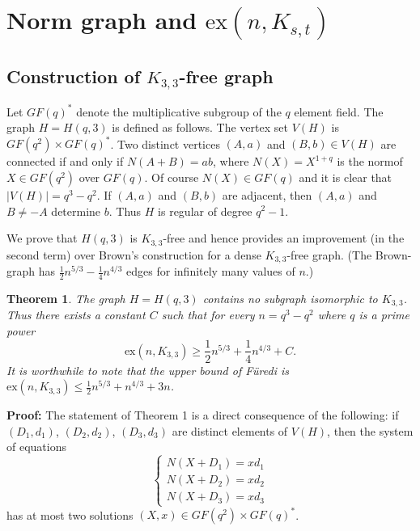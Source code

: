 \documentclass[12pt]{article}
\newtheorem{theorem}{Theorem}
\newcommand{\ex}{\mathrm{ex}}
\begin{document}
\section{Norm graph and $\ex(n,K_{s,t})$}
\subsection{Construction of $K_{3,3}$-free graph}
	Let $ GF(q)^* $ denote the multiplicative subgroup of the $ q $ element field. The graph $ H = H(q, 3) $ is defined as follows. The vertex set $ V(H) $ is $ GF(q^2) \times GF(q)^* $. Two distinct vertices $ (A, a) $ and $ (B, b) \in V(H) $ are connected if and only if $ N(A + B) = ab $, where $ N(X) = X^{1 + q} $ is the norm\footnotemark[1] of $ X \in GF(q^2) $ over $ GF(q) $. Of course $ N(X) \in GF(q) $ and it is clear that $ |V(H)| = q^3 - q^2 $. If $ (A, a) $ and $ (B, b) $ are adjacent, then $ (A, a) $ and $ B \neq -A $ determine $ b $. Thus $ H $ is regular of degree $ q^2 - 1 $.
	
	We prove that $ H(q, 3) $ is $ K_{3,3} $-free and hence provides an improvement (in the second term) over Brown's construction for a dense $ K_{3,3} $-free graph. (The Brown-graph has $ \frac{1}{2}n^{5/3} - \frac{1}{4}n^{4/3} $ edges for infinitely many values of $ n $.)
	
	\begin{theorem}\label{alonthm}
		The graph $ H = H(q, 3) $ contains no subgraph isomorphic to $ K_{3,3} $. Thus there exists a constant $ C $ such that for every $ n = q^3 - q^2 $ where $ q $ is a prime power
		\[
		\mathrm{ex}(n, K_{3,3}) \geqslant \frac{1}{2}n^{5/3} + \frac{1}{4}n^{4/3} + C.
		\]
		It is worthwhile to note that the upper bound of F\"{u}redi  is $ \mathrm{ex}(n, K_{3,3}) \leqslant \frac{1}{2}n^{5/3} + n^{4/3} + 3n $.
	\end{theorem}
		{\bf Proof:} The statement of Theorem 1 is a direct consequence of the following: if $ (D_1, d_1) $, $ (D_2, d_2) $, $ (D_3, d_3) $ are distinct elements of $ V(H) $, then the system of equations
		\[
		\begin{cases}
			N(X + D_1) = x d_1 \\
			N(X + D_2) = x d_2 \\
			N(X + D_3) = x d_3
		\end{cases} \tag{4}
		\]
		has at most two solutions $ (X, x) \in GF(q^2) \times GF(q)^* $.
		
\end{document}
